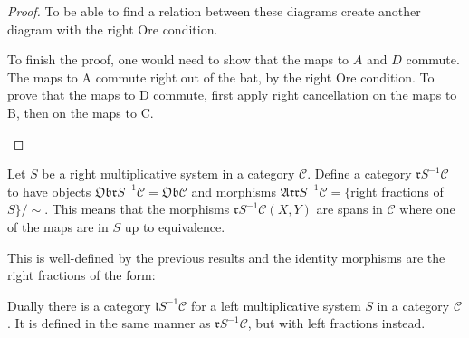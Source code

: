 \begin{proof}
        To be able to find a relation between these diagrams create another diagram with the right Ore condition.
        \begin{center}
            \begin{minipage}[c]{0.3\textwidth}
            \end{minipage}
            \begin{minipage}[c]{0.5\textwidth}
                To finish the proof, one would need to show that the maps to $A$ and $D$ commute. The maps to A commute right out of the bat, by the right Ore condition. To prove that the maps to D commute, first apply right cancellation on the maps to B, then on the maps to C.
            \end{minipage}
        \end{center}
    \end{proof}

    \begin{definition}
        Let $S$ be a right multiplicative system in a category $\mathcal{C}$. Define a category $\mathfrak{r}S^{-1}\mathcal{C}$ to have objects $\mathfrak{Obr}S^{-1}\mathcal{C}=\mathfrak{Ob}\mathcal{C}$ and morphisms $\mathfrak{Arr}S^{-1}\mathcal{C} = \{$right fractions of $S\}/\sim$. This means that the morphisms $\mathfrak{r}S^{-1}\mathcal{C}(X,Y)$ are spans in $\mathcal{C}$ where one of the maps are in $S$ up to equivalence.
        \begin{center}
        \end{center}
        This is well-defined by the previous results and the identity morphisms are the right fractions of the form:
        \begin{center}
        \end{center}
    \end{definition}

    \begin{remark}
        Dually there is a category $\mathfrak{l}S^{-1}\mathcal{C}$ for a left multiplicative system $S$ in a category $\mathcal{C}$. It is defined in the same manner as $\mathfrak{r}S^{-1}\mathcal{C}$, but with left fractions instead.
    \end{remark}


